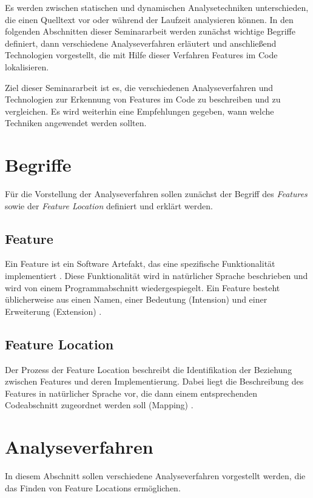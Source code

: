 \documentclass[runningheads,a4paper]{llncs}
\begin{document}
Es werden zwischen statischen und dynamischen Analysetechniken unterschieden, die einen Quelltext vor oder während der Laufzeit analysieren können. In den folgenden Abschnitten dieser Seminararbeit werden zunächst wichtige Begriffe definiert, dann verschiedene Analyseverfahren erläutert und anschließend Technologien vorgestellt, die mit Hilfe dieser Verfahren Features im Code lokalisieren.

Ziel dieser Seminararbeit ist es, die verschiedenen Analyseverfahren und Technologien zur Erkennung von Features im Code zu beschreiben und zu vergleichen. Es wird weiterhin eine Empfehlungen gegeben, wann welche Techniken angewendet werden sollten.

\section{Begriffe}

Für die Vorstellung der Analyseverfahren sollen zunächst der Begriff des \textit{Features} sowie der \textit{Feature Location} definiert und erklärt werden.

\subsection*{Feature}
Ein Feature ist ein Software Artefakt, das eine spezifische Funktionalität implementiert \cite{feature}. Diese Funktionalität wird in natürlicher Sprache beschrieben und wird von einem Programmabschnitt wiedergespiegelt. Ein Feature besteht üblicherweise aus einen Namen, einer Bedeutung (Intension) und einer Erweiterung (Extension) \cite{rajlich-chen}.

\subsection*{Feature Location}
Der Prozess der Feature Location beschreibt die Identifikation der Beziehung zwischen Features und deren Implementierung. Dabei liegt die Beschreibung des Features in natürlicher Sprache vor, die dann einem entsprechenden Codeabschnitt zugeordnet werden soll (Mapping) \cite{survey}.

\section{Analyseverfahren}

In diesem Abschnitt sollen verschiedene Analyseverfahren vorgestellt werden, die das Finden von Feature Locations ermöglichen.
\end{document}
